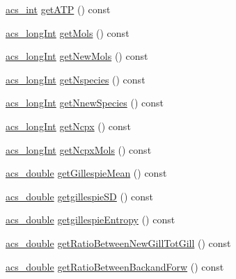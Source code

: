 \begin{DoxyCompactItemize}
\hyperlink{acs__headers_8h_a8d277355641a098190360234e2ebde35}{acs\-\_\-int} \hyperlink{classenvironment_a02346c5d824e83e0a76dd01f4672ad8b}{get\-A\-T\-P} () const 
\item 
\hyperlink{acs__headers_8h_a19319d75f02db4308bc5c0026d98cd85}{acs\-\_\-long\-Int} \hyperlink{classenvironment_a5a2ee72147144e7a04f4b363f1cc0914}{get\-Mols} () const 
\item 
\hyperlink{acs__headers_8h_a19319d75f02db4308bc5c0026d98cd85}{acs\-\_\-long\-Int} \hyperlink{classenvironment_a57e1eb6043a54fbebd2ac01ebdac9fa1}{get\-New\-Mols} () const 
\item 
\hyperlink{acs__headers_8h_a19319d75f02db4308bc5c0026d98cd85}{acs\-\_\-long\-Int} \hyperlink{classenvironment_aebc2bf6d400686a73dae1f6162cfeadc}{get\-Nspecies} () const 
\item 
\hyperlink{acs__headers_8h_a19319d75f02db4308bc5c0026d98cd85}{acs\-\_\-long\-Int} \hyperlink{classenvironment_a4a2b21d139acc93ae0fdf29c8b025cce}{get\-Nnew\-Species} () const 
\item 
\hyperlink{acs__headers_8h_a19319d75f02db4308bc5c0026d98cd85}{acs\-\_\-long\-Int} \hyperlink{classenvironment_a5f6c40cbf788d58db588dc6280f0174f}{get\-Ncpx} () const 
\item 
\hyperlink{acs__headers_8h_a19319d75f02db4308bc5c0026d98cd85}{acs\-\_\-long\-Int} \hyperlink{classenvironment_a39bb98a336b69f25479b8f82b9928bd3}{get\-Ncpx\-Mols} () const 
\item 
\hyperlink{acs__headers_8h_ab776853a005fcbf56af0424a2a4dd607}{acs\-\_\-double} \hyperlink{classenvironment_a389a70abe42c7652c9511b7ed3b974c0}{get\-Gillespie\-Mean} () const 
\item 
\hyperlink{acs__headers_8h_ab776853a005fcbf56af0424a2a4dd607}{acs\-\_\-double} \hyperlink{classenvironment_a41d9f79794b74845f2d00b4c0affea02}{getgillespie\-S\-D} () const 
\item 
\hyperlink{acs__headers_8h_ab776853a005fcbf56af0424a2a4dd607}{acs\-\_\-double} \hyperlink{classenvironment_af4cba1a1f9c1c0106241ca5338b7906d}{getgillespie\-Entropy} () const 
\item 
\hyperlink{acs__headers_8h_ab776853a005fcbf56af0424a2a4dd607}{acs\-\_\-double} \hyperlink{classenvironment_a98a4989029d77e99cf2ca9fb0eb1c2ab}{get\-Ratio\-Between\-New\-Gill\-Tot\-Gill} () const 
\item 
\hyperlink{acs__headers_8h_ab776853a005fcbf56af0424a2a4dd607}{acs\-\_\-double} \hyperlink{classenvironment_aa0e7940868932ac4b26fd61943952528}{get\-Ratio\-Between\-Backand\-Forw} () const 

\end{DoxyCompactItemize}
